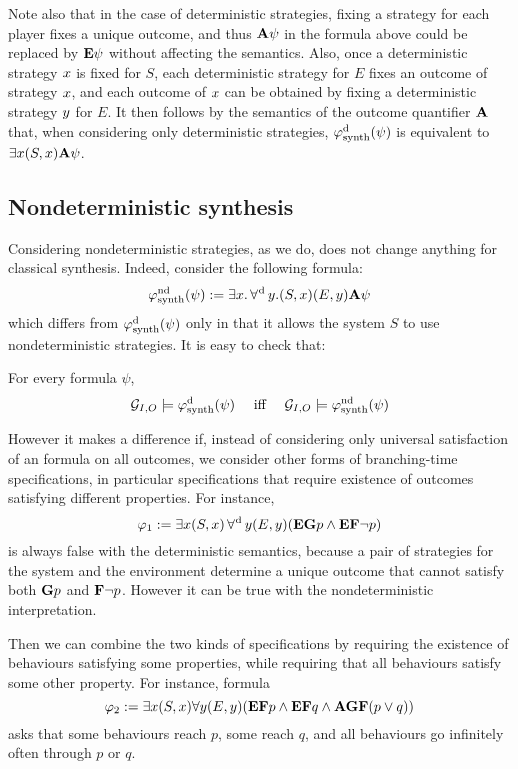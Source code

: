 Note also that in the case of deterministic strategies, fixing a
strategy for each player fixes a unique outcome, and thus ${\bf A}\psi$ in
the formula above could be replaced by ${\bf E}\psi$ without affecting the semantics.
Also, once a deterministic strategy $x$ is fixed for $S$, each
deterministic strategy for $E$ fixes an outcome of strategy $x$, and each outcome
of $x$ can be obtained by fixing a deterministic strategy $y$
for $E$. It then follows by the
semantics of the outcome quantifier ${\bf A}$ that, when
considering only deterministic strategies,
$\varphi^{\text{d}}_{\text{synth}}(\psi)$ is equivalent to $\exists x (S,x){\bf A}\psi$.

\subsection{Nondeterministic synthesis}
\label{sec-nd-synth}

Considering nondeterministic strategies, as we do, does not change
anything for classical \LTL synthesis. Indeed, consider the following
formula:
\[\varphi^{\text{nd}}_{\text{synth}}(\psi):=\exists x.   \operatorname*{\forall^{\hskip.5pt\text{d}}} y.
 (S,x)(E,y) {\bf A} \psi\]
which differs from $\varphi^{\text{d}}_{\text{synth}}(\psi)$ only in that it allows the system
$S$ to use nondeterministic strategies. It is easy to check that:
\begin{proposition}
  \label{prop-equiv-synth}
  For every \LTL formula $\psi$, \[\CGS_{I,O}\models
  \phisynthdet(\psi) \quad\mbox{ iff } \quad\CGS_{I,O}\models \phisynthndet(\psi)\]
\end{proposition}



However it makes a difference if, instead of considering only
universal satisfaction of an \LTL formula on all outcomes, we consider
other forms of branching-time specifications, in particular
specifications that require existence of outcomes satisfying different
properties. For instance,
\[\varphi_1:=\exists x (S,x) \operatorname*{\forall^{\hskip.5pt\text{d}}} y (E,y) ({\bf E} {\bf G} p
  \wedge {\bf E} {\bf F} \neg p)\]
is always false with the deterministic semantics, because a pair of
strategies for the system and the environment determine a unique
outcome that cannot satisfy both ${\bf G} p$ and ${\bf F}\neg p$.
However it can be true with the
nondeterministic interpretation.

Then we can combine the two kinds of specifications by  requiring the
existence of behaviours satisfying some properties, while requiring
that all  behaviours satisfy some other property.
For instance, formula
\[\varphi_2:=\exists x (S,x) \forall y (E,y)({\bf E} {\bf F} p \wedge {\bf E} {\bf F}
  q \wedge {\bf A} {\bf G} {\bf F} (p\vee q))\]
  asks that some behaviours 
 reach $p$, some  reach $q$, and all behaviours go infinitely
 often through $p$ or $q$.

